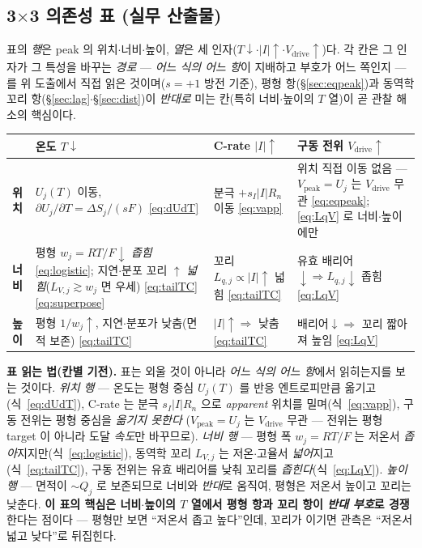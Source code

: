 \documentclass[11pt,a4paper]{article}
\newcommand{\drive}{\mathrm{drive}}
\newcommand{\peak}{\mathrm{peak}}
\begin{document}
\subsection{3$\times$3 의존성 표 (실무 산출물)}
표의 \emph{행}은 peak 의 위치$\cdot$너비$\cdot$높이, \emph{열}은 세 인자($T\downarrow$$\cdot$$|I|\uparrow$$\cdot$$V_\drive\uparrow$)다.
각 칸은 그 인자가 그 특성을 바꾸는 \emph{경로} — \emph{어느 식의 어느 항}이 지배하고 부호가 어느 쪽인지 — 를 위
도출에서 직접 읽은 것이며($s=+1$ 방전 기준), 평형 항(\S\ref{sec:eqpeak})과 동역학 꼬리 항(\S\ref{sec:lag}$\cdot$\S\ref{sec:dist})이
\emph{반대로} 미는 칸(특히 너비$\cdot$높이의 $T$ 열)이 곧 관찰 해소의 핵심이다.
\begin{center}
\renewcommand{\arraystretch}{1.4}
\begin{tabular}{p{} p{} p{} p{}}
\toprule
 & \textbf{온도 $T\downarrow$} & \textbf{C-rate $|I|\uparrow$} & \textbf{구동 전위 $V_\drive\uparrow$} \\
\midrule
\textbf{위치} & $U_j(T)$ 이동, $\partial U_j/\partial T=\Delta S_j/(sF)$ \eqref{eq:dUdT} & 분극 $+s_I|I|R_n$ 이동 \eqref{eq:vapp} & 위치 직접 이동 없음 — $V_\peak=U_j$ 는 $V_\drive$ 무관 \eqref{eq:eqpeak}; \eqref{eq:LqV} 로 너비$\cdot$높이에만 \\
\textbf{너비} & 평형 $w_j=RT/F\downarrow$ \emph{좁힘} \eqref{eq:logistic}; 지연$\cdot$분포 꼬리 $\uparrow$ \emph{넓힘}($L_{V,j}\!\gtrsim\!w_j$ 면 우세) \eqref{eq:tailTC}\eqref{eq:superpose} & 꼬리 $L_{q,j}\propto|I|\uparrow$ 넓힘 \eqref{eq:tailTC} & 유효 배리어$\downarrow\Rightarrow L_{q,j}\downarrow$ 좁힘 \eqref{eq:LqV} \\
\textbf{높이} & 평형 $1/w_j\uparrow$, 지연$\cdot$분포가 낮춤(면적 보존) \eqref{eq:tailTC} & $|I|\uparrow\Rightarrow$ 낮춤 \eqref{eq:tailTC} & 배리어$\downarrow\Rightarrow$ 꼬리 짧아져 높임 \eqref{eq:LqV} \\
\bottomrule
\end{tabular}
\end{center}
\textbf{표 읽는 법(칸별 기전).} 표는 외울 것이 아니라 \emph{어느 식의 어느 항}에서 읽히는지를 보는 것이다.
\emph{위치 행} — 온도는 평형 중심 $U_j(T)$ 를 반응 엔트로피만큼 옮기고(식~\eqref{eq:dUdT}), C-rate 는 분극
$s_I|I|R_n$ 으로 \emph{apparent} 위치를 밀며(식~\eqref{eq:vapp}), 구동 전위는 평형 중심을 \emph{옮기지 못한다}
($V_\peak=U_j$ 는 $V_\drive$ 무관 — 전위는 평형 target 이 아니라 도달 \emph{속도}만 바꾸므로). \emph{너비 행} — 평형
폭 $w_j=RT/F$ 는 저온서 \emph{좁아}지지만(식~\eqref{eq:logistic}), 동역학 꼬리 $L_{V,j}$ 는 저온$\cdot$고율서
\emph{넓어}지고(식~\eqref{eq:tailTC}), 구동 전위는 유효 배리어를 낮춰 꼬리를 \emph{좁힌다}(식~\eqref{eq:LqV}).
\emph{높이 행} — 면적이 $\sim Q_j$ 로 보존되므로 너비와 \emph{반대}로 움직여, 평형은 저온서 높이고 꼬리는 낮춘다.
\textbf{이 표의 핵심은 너비$\cdot$높이의 $T$ 열에서 평형 항과 꼬리 항이 \emph{반대 부호}로 경쟁}한다는 점이다 —
평형만 보면 ``저온서 좁고 높다''인데, 꼬리가 이기면 관측은 ``저온서 넓고 낮다''로 뒤집힌다.
\end{document}
